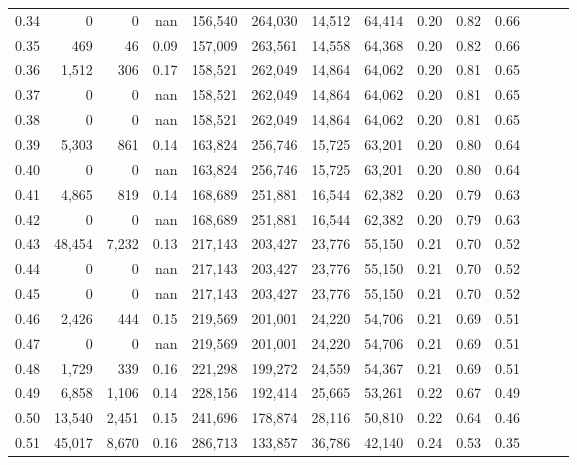 \begin{tabular}{rrrrrrrrrrrrrr}
0.34 &       0 &      0 &   nan &  156,540 &  264,030 &  14,512 &  64,414 &  0.20 &  0.82 &      0.66 \\
0.35 &     469 &     46 &  0.09 &  157,009 &  263,561 &  14,558 &  64,368 &  0.20 &  0.82 &      0.66 \\
0.36 &   1,512 &    306 &  0.17 &  158,521 &  262,049 &  14,864 &  64,062 &  0.20 &  0.81 &      0.65 \\
0.37 &       0 &      0 &   nan &  158,521 &  262,049 &  14,864 &  64,062 &  0.20 &  0.81 &      0.65 \\
0.38 &       0 &      0 &   nan &  158,521 &  262,049 &  14,864 &  64,062 &  0.20 &  0.81 &      0.65 \\
0.39 &   5,303 &    861 &  0.14 &  163,824 &  256,746 &  15,725 &  63,201 &  0.20 &  0.80 &      0.64 \\
0.40 &       0 &      0 &   nan &  163,824 &  256,746 &  15,725 &  63,201 &  0.20 &  0.80 &      0.64 \\
0.41 &   4,865 &    819 &  0.14 &  168,689 &  251,881 &  16,544 &  62,382 &  0.20 &  0.79 &      0.63 \\
0.42 &       0 &      0 &   nan &  168,689 &  251,881 &  16,544 &  62,382 &  0.20 &  0.79 &      0.63 \\
0.43 &  48,454 &  7,232 &  0.13 &  217,143 &  203,427 &  23,776 &  55,150 &  0.21 &  0.70 &      0.52 \\
0.44 &       0 &      0 &   nan &  217,143 &  203,427 &  23,776 &  55,150 &  0.21 &  0.70 &      0.52 \\
0.45 &       0 &      0 &   nan &  217,143 &  203,427 &  23,776 &  55,150 &  0.21 &  0.70 &      0.52 \\
0.46 &   2,426 &    444 &  0.15 &  219,569 &  201,001 &  24,220 &  54,706 &  0.21 &  0.69 &      0.51 \\
0.47 &       0 &      0 &   nan &  219,569 &  201,001 &  24,220 &  54,706 &  0.21 &  0.69 &      0.51 \\
0.48 &   1,729 &    339 &  0.16 &  221,298 &  199,272 &  24,559 &  54,367 &  0.21 &  0.69 &      0.51 \\
0.49 &   6,858 &  1,106 &  0.14 &  228,156 &  192,414 &  25,665 &  53,261 &  0.22 &  0.67 &      0.49 \\
0.50 &  13,540 &  2,451 &  0.15 &  241,696 &  178,874 &  28,116 &  50,810 &  0.22 &  0.64 &      0.46 \\
0.51 &  45,017 &  8,670 &  0.16 &  286,713 &  133,857 &  36,786 &  42,140 &  0.24 &  0.53 &      0.35 \\

\end{tabular}
